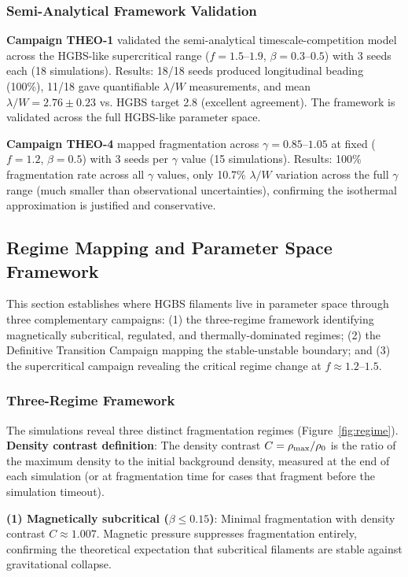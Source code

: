 \documentclass[twocolumn]{mnras}
\begin{document}
\subsubsection{Semi-Analytical Framework Validation}

\textbf{Campaign THEO-1} validated the semi-analytical timescale-competition model across the HGBS-like supercritical range ($f = 1.5$--$1.9$, $\beta = 0.3$--$0.5$) with 3 seeds each (18 simulations). Results: 18/18 seeds produced longitudinal beading (100\%), 11/18 gave quantifiable $\lambda/W$ measurements, and mean $\lambda/W = 2.76 \pm 0.23$ vs. HGBS target 2.8 (excellent agreement). The framework is validated across the full HGBS-like parameter space.

\textbf{Campaign THEO-4} mapped fragmentation across $\gamma = 0.85$--$1.05$ at fixed ($f = 1.2$, $\beta = 0.5$) with 3 seeds per $\gamma$ value (15 simulations). Results: 100\% fragmentation rate across all $\gamma$ values, only 10.7\% $\lambda/W$ variation across the full $\gamma$ range (much smaller than observational uncertainties), confirming the isothermal approximation is justified and conservative.

\subsection{Regime Mapping and Parameter Space Framework}

This section establishes where HGBS filaments live in parameter space through three complementary campaigns: (1) the three-regime framework identifying magnetically subcritical, regulated, and thermally-dominated regimes; (2) the Definitive Transition Campaign mapping the stable-unstable boundary; and (3) the supercritical campaign revealing the critical regime change at $f \approx 1.2$--$1.5$.

\subsubsection{Three-Regime Framework}

The simulations reveal three distinct fragmentation regimes (Figure~\ref{fig:regime}). \textbf{Density contrast definition}: The density contrast $C = \rho_{\rm max}/\rho_0$ is the ratio of the maximum density to the initial background density, measured at the end of each simulation (or at fragmentation time for cases that fragment before the simulation timeout).

\textbf{(1) Magnetically subcritical ($\beta \leq 0.15$)}: Minimal fragmentation with density contrast $C \approx 1.007$. Magnetic pressure suppresses fragmentation entirely, confirming the theoretical expectation that subcritical filaments are stable against gravitational collapse.
\end{document}
